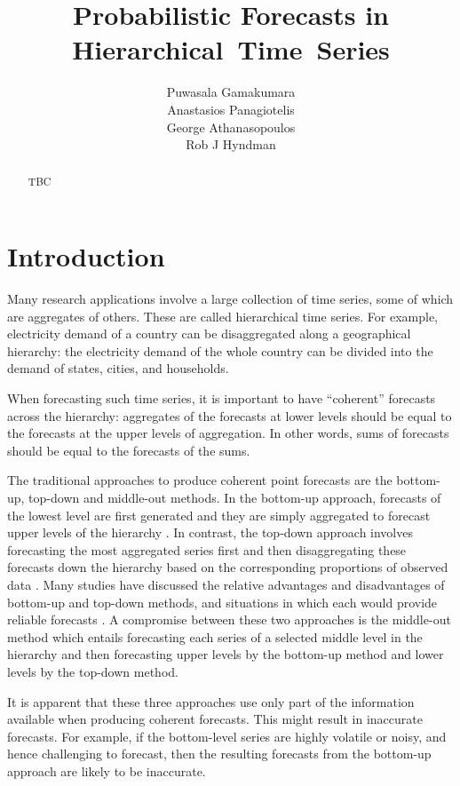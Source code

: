 \documentclass[a4paper, 11pt]{article}
\title{Probabilistic Forecasts in Hierarchical~Time~Series}
\author{Puwasala Gamakumara\\ Anastasios Panagiotelis\\ George Athanasopoulos\\ Rob J Hyndman}
\theoremstyle{theo}
\theoremstyle{definition}
\begin{document}
  
\maketitle

\begin{abstract}
  TBC
\end{abstract}


\section{Introduction}\label{sec:intro}

Many research applications involve a large collection of time series, some of which are aggregates of others. These are called hierarchical time series. For example, electricity demand of a country can be disaggregated along a geographical hierarchy: the electricity demand of the whole country can be divided into the demand of states, cities, and households. 

When forecasting such time series, it is important to have ``coherent'' forecasts across the hierarchy: aggregates of the forecasts at lower levels should be equal to the forecasts at the upper levels of aggregation. In other words, sums of forecasts should be equal to the forecasts of the sums.

The traditional approaches to produce coherent point forecasts are the bottom-up, top-down and middle-out methods. In the bottom-up approach, forecasts of the lowest level are first generated and they are simply aggregated to forecast upper levels of the hierarchy \citep{Dunn1976}. In contrast, the top-down approach involves forecasting the most aggregated series first and then disaggregating these forecasts down the hierarchy based on the corresponding proportions of observed data \citep{Gross1990}. Many studies have discussed the relative advantages and disadvantages of bottom-up and top-down methods, and situations in which each would provide reliable forecasts \citep{Schwarzkopf1988,Kahn1998, Lapide1998,Fliedner2001}. A compromise between these two approaches is the middle-out method which entails forecasting each series of a selected middle level in the hierarchy and then forecasting upper levels by the bottom-up method and lower levels by the top-down method. 

It is apparent that these three approaches use only part of the information available when producing coherent forecasts. This might result in inaccurate forecasts. For example, if the bottom-level series are highly volatile or noisy, and hence challenging to forecast, then the resulting forecasts from the bottom-up approach are likely to be inaccurate.
\end{document}
